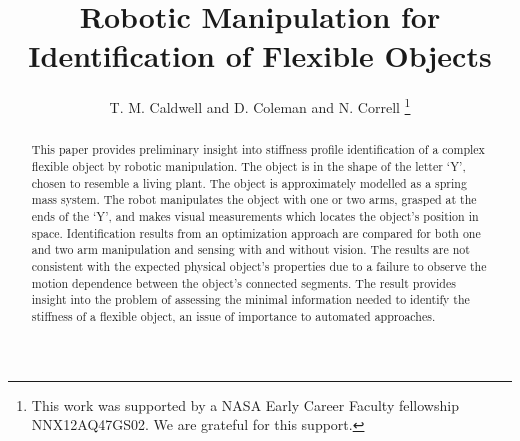 \documentclass[runningheads,a4paper]{llncs}
\begin{document}
\mainmatter  %

\title{Robotic Manipulation for Identification of Flexible Objects}



\author{T. M. Caldwell and  D. Coleman and N. Correll%
\thanks{
This work was supported by a NASA
Early Career Faculty fellowship NNX12AQ47GS02. We are grateful for this support.}%
}
%


\maketitle

\begin{abstract}
This paper provides preliminary insight into stiffness profile identification of a complex flexible object by robotic manipulation. The object is in the shape of the letter `Y', chosen to resemble a living plant.  The object is approximately modelled as a spring mass system. The robot manipulates the object with one or two arms, grasped at the ends of the `Y', and makes visual measurements which locates the object's position in space.  Identification results from an optimization approach are compared for both one and two arm manipulation and sensing with and without vision. The results are not consistent with the expected physical object's properties due to a failure to observe the motion dependence between the object's connected segments. The result provides insight into the problem of assessing the minimal information needed to identify the stiffness of a flexible object, an issue of importance to automated approaches.%
\end{abstract}
\end{document}
